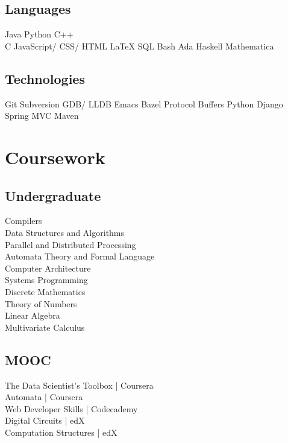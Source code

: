 \documentclass[letterpaper]{deedy-resume} %
\begin{document}
\begin{minipage}[t]{0.33\textwidth}
\subsection{Languages}

Java \textbullet{} Python \textbullet{} C++\\ 
C \textbullet{} JavaScript/ CSS/ HTML \textbullet{} \LaTeX \textbullet{} SQL Bash \textbullet{} Ada \textbullet{} Haskell \textbullet{} Mathematica
\sectionspace

\subsection{Technologies}
Git \textbullet{} Subversion \textbullet{} GDB/ LLDB \textbullet{} Emacs Bazel \textbullet{} Protocol Buffers \textbullet{} Python Django Spring MVC \textbullet{} Maven 
\sectionspace %


\section{Coursework}

\subsection{Undergraduate}

Compilers \\
Data Structures and Algorithms \\
Parallel and Distributed Processing \\
Automata Theory and Formal Language \\
Computer Architecture \\
Systems Programming \\
Discrete Mathematics \\
Theory of Numbers \\
Linear Algebra \\
Multivariate Calculus

\sectionspace %

\subsection{MOOC}

The Data Scientist's Toolbox | Coursera \\
Automata | Coursera \\
Web Developer Skills | Codecademy \\
Digital Circuits | edX \\
Computation Structures | edX

\sectionspace


\end{minipage} %
\end{document}
